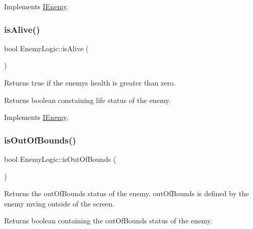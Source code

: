 Implements \hyperlink{class_i_enemy}{I\+Enemy}.

\mbox{\label{class_enemy_logic_a8dd48fa112c41249e46728d7ec8f820e}} 
\subsubsection{\texorpdfstring{is\+Alive()}{isAlive()}}
{\footnotesize\ttfamily bool Enemy\+Logic\+::is\+Alive (\begin{DoxyParamCaption}{ }\end{DoxyParamCaption})\hspace{0.3cm}{\ttfamily [virtual]}}



Returns true if the enemy\textquotesingle{}s health is greater than zero. 

\begin{DoxyReturn}{Returns}
boolean constaining life status of the enemy. 
\end{DoxyReturn}


Implements \hyperlink{class_i_enemy}{I\+Enemy}.

\mbox{\label{class_enemy_logic_a2e3e9e006259b36745beff4b55fd9bdc}} 
\subsubsection{\texorpdfstring{is\+Out\+Of\+Bounds()}{isOutOfBounds()}}
{\footnotesize\ttfamily bool Enemy\+Logic\+::is\+Out\+Of\+Bounds (\begin{DoxyParamCaption}{ }\end{DoxyParamCaption})}



Returns the out\+Of\+Bounds status of the enemy. out\+Of\+Bounds is defined by the enemy mving outside of the screen. 

\begin{DoxyReturn}{Returns}
boolean containing the out\+Of\+Bounds status of the enemy. 
\end{DoxyReturn}
\mbox{\label{class_enemy_logic_a560cc578db8a77f250b63a111f51125e}} 
